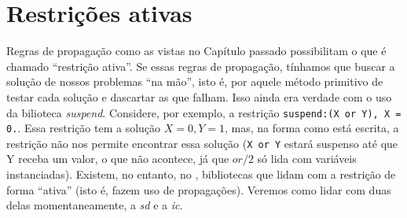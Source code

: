 \documentclass{article}
\begin{document}
\section{Restrições ativas}

Regras de propagação como as vistas no Capítulo passado possibilitam o que é chamado ``restrição ativa''. Se essas regras de
propagação, tínhamos que buscar a solução de nossos problemas ``na mão'', isto é, por aquele método primitivo de testar cada
solução e dascartar as que falham. Isso ainda era verdade com o uso da bilioteca \textit{suspend}. Considere, por exemplo, a restrição {\tt suspend:(X or Y), X = 0.}. Essa restrição tem a solução ${X=0,Y=1}$, mas, na forma como está escrita, a restrição
não nos permite encontrar essa solução ({\tt X or Y} estará suspenso até que Y receba um valor, o que não acontece, já que $or/2$
só lida com variáveis instanciadas). Existem, no entanto, no \eclipse, bibliotecas que lidam com a restrição de forma ``ativa''
(isto é, fazem uso de propagações). Veremos como lidar com duas delas momentaneamente, a {\it sd} e a {\it ic}.
\end{document}

